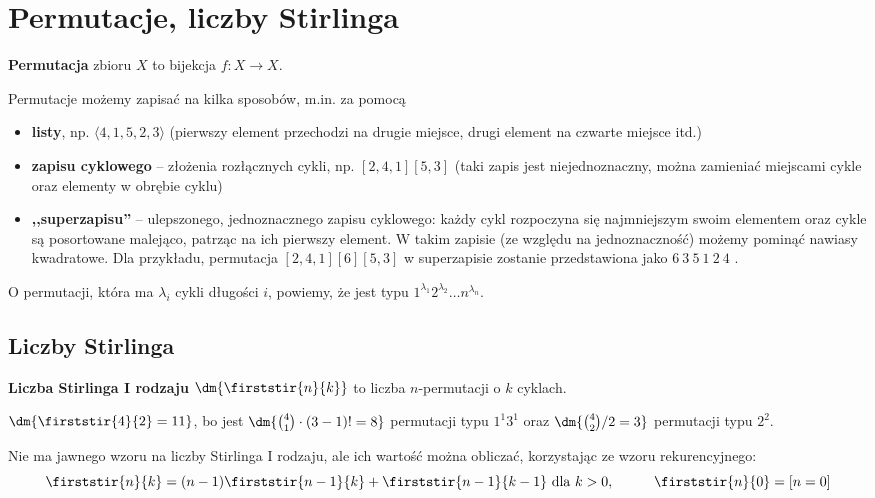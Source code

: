 \section{Permutacje, liczby Stirlinga}

\textbf{Permutacja} zbioru $X$ to bijekcja $f : X \to X$. 

Permutacje możemy zapisać na kilka sposobów, m.in. za pomocą
\begin{itemize}
    \item \textbf{listy}, np. $\langle 4, 1, 5, 2, 3 \rangle$ (pierwszy element przechodzi na drugie miejsce, drugi element na czwarte miejsce itd.)
    \item \textbf{zapisu cyklowego} -- złożenia rozłącznych cykli, np. $[2, 4, 1][5, 3]$ (taki zapis jest niejednoznaczny, można zamieniać miejscami cykle oraz elementy w obrębie cyklu)
    \item \textbf{,,superzapisu''} -- ulepszonego, jednoznacznego zapisu cyklowego: każdy cykl rozpoczyna się najmniejszym swoim elementem oraz cykle są posortowane malejąco, patrząc na ich pierwszy element. W takim zapisie (ze względu na jednoznaczność) możemy pominąć nawiasy kwadratowe. Dla przykładu, permutacja $[2, 4, 1][6][5, 3]$ w superzapisie zostanie przedstawiona jako $6 \ 3 \ 5 \ 1 \ 2 \ 4$ \gray{(= [6][3, 5][1, 2, 4])}.
\end{itemize}

O permutacji, która ma $\lambda_i$ cykli długości $i$, powiemy, że jest typu 
$1^{\lambda_1} 2^{\lambda_2} \dots n^{\lambda_n}$.

\subsection{Liczby Stirlinga}
\textbf{Liczba Stirlinga I rodzaju} $\dm{\firststir{n}{k}}$ to liczba $n$-permutacji o $k$ cyklach.

\begin{example}
$\dm{\firststir{4}{2} = 11}$, bo jest $\dm{\binom{4}{1} \cdot (3 - 1)! = 8}$ permutacji typu $1^1 3^1$ oraz $\dm{\binom{4}{2} / 2 = 3}$ permutacji typu $2^2$.
\end{example}

Nie ma jawnego wzoru na liczby Stirlinga I rodzaju, ale ich wartość można obliczać, korzystając ze wzoru rekurencyjnego:
$$\firststir{n}{k} = (n - 1) 
\firststir{n - 1}{k} + \firststir{n - 1}{k - 1} \text{ dla $k > 0$}, \hspace{1cm} \firststir{n}{0} = [n = 0]$$

